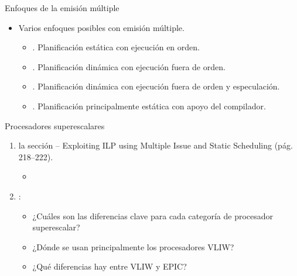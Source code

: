 \begin{frame}[t]{Enfoques de la emisión múltiple}
\begin{itemize}
  \item Varios enfoques posibles con emisión múltiple.
    \begin{itemize}
      \item {}.
            Planificación estática con ejecución en orden.

      \item {}.
            Planificación dinámica con ejecución fuera de orden.

      \item {}.
            Planificación dinámica con ejecución fuera de orden y especulación.

      \item {}.
            Planificación principalmente estática con apoyo del compilador.
    \end{itemize}
\end{itemize}
\end{frame}

\begin{frame}[t]{Procesadores superescalares}
\begin{enumerate}
  \item {} la sección  --
        Exploiting ILP using Multiple Issue and Static Scheduling
        (pág. 218--222).
    \begin{itemize}
      \item \bibhennessy
    \end{itemize}

  \item {}:
    \begin{itemize}
      \item ¿Cuáles son las diferencias clave para cada categoría de procesador superescalar?
      \item ¿Dónde se usan principalmente los procesadores VLIW?
      \item ¿Qué diferencias hay entre VLIW y EPIC?
    \end{itemize}
\end{enumerate}
\end{frame}
